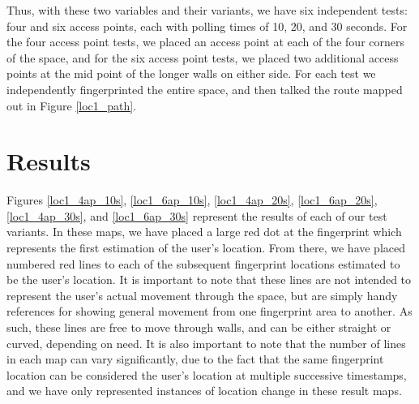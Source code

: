 Thus, with these two variables and their variants, we have six independent tests: four and six access points, each with polling times of 10, 20, and 30 seconds. For the four access point tests, we placed an access point at each of the four corners of the space, and for the six access point tests, we placed two additional access points at the mid point of the longer walls on either side. For each test we independently fingerprinted the entire space, and then talked the route mapped out in Figure \ref{loc1_path}.


\section{Results}
%


Figures \ref{loc1_4ap_10s}, \ref{loc1_6ap_10s}, \ref{loc1_4ap_20s}, \ref{loc1_6ap_20s}, \ref{loc1_4ap_30s}, and \ref{loc1_6ap_30s} represent the results of each of our test variants. In these maps, we have placed a large red dot at the fingerprint which represents the first estimation of the user's location. From there, we have placed numbered red lines to each of the subsequent fingerprint locations estimated to be the user's location. It is important to note that these lines are not intended to represent the user's actual movement through the space, but are simply handy references for showing general movement from one fingerprint area to another. As such, these lines are free to move through walls, and can be either straight or curved, depending on need.  It is also important to note that the number of lines in each map can vary significantly, due to the fact that the same fingerprint location can be considered the user's location at multiple successive timestamps, and we have only represented instances of location change in these result maps. 


